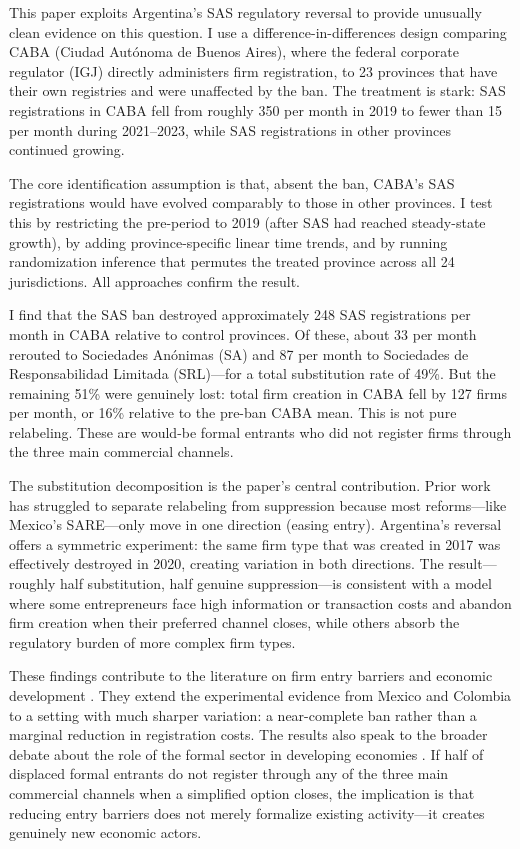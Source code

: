 \documentclass[12pt]{article}
\begin{document}
This paper exploits Argentina's SAS regulatory reversal to provide unusually clean evidence on this question. I use a difference-in-differences design comparing CABA (Ciudad Aut\'onoma de Buenos Aires), where the federal corporate regulator (IGJ) directly administers firm registration, to 23 provinces that have their own registries and were unaffected by the ban. The treatment is stark: SAS registrations in CABA fell from roughly 350 per month in 2019 to fewer than 15 per month during 2021--2023, while SAS registrations in other provinces continued growing.

The core identification assumption is that, absent the ban, CABA's SAS registrations would have evolved comparably to those in other provinces. I test this by restricting the pre-period to 2019 (after SAS had reached steady-state growth), by adding province-specific linear time trends, and by running randomization inference that permutes the treated province across all 24 jurisdictions. All approaches confirm the result.

I find that the SAS ban destroyed approximately 248 SAS registrations per month in CABA relative to control provinces. Of these, about 33 per month rerouted to Sociedades An\'onimas (SA) and 87 per month to Sociedades de Responsabilidad Limitada (SRL)---for a total substitution rate of 49\%. But the remaining 51\% were genuinely lost: total firm creation in CABA fell by 127 firms per month, or 16\% relative to the pre-ban CABA mean. This is not pure relabeling. These are would-be formal entrants who did not register firms through the three main commercial channels.

The substitution decomposition is the paper's central contribution. Prior work has struggled to separate relabeling from suppression because most reforms---like Mexico's SARE---only move in one direction (easing entry). Argentina's reversal offers a symmetric experiment: the same firm type that was created in 2017 was effectively destroyed in 2020, creating variation in both directions. The result---roughly half substitution, half genuine suppression---is consistent with a model where some entrepreneurs face high information or transaction costs and abandon firm creation when their preferred channel closes, while others absorb the regulatory burden of more complex firm types.

These findings contribute to the literature on firm entry barriers and economic development \citep{djankov2002regulation, klapper2006entry, bruhn2011, kaplan2011entry}. They extend the experimental evidence from Mexico and Colombia \citep{cardenas2010anti} to a setting with much sharper variation: a near-complete ban rather than a marginal reduction in registration costs. The results also speak to the broader debate about the role of the formal sector in developing economies \citep{la2004informality, ulyssea2018firms}. If half of displaced formal entrants do not register through any of the three main commercial channels when a simplified option closes, the implication is that reducing entry barriers does not merely formalize existing activity---it creates genuinely new economic actors.
\end{document}
